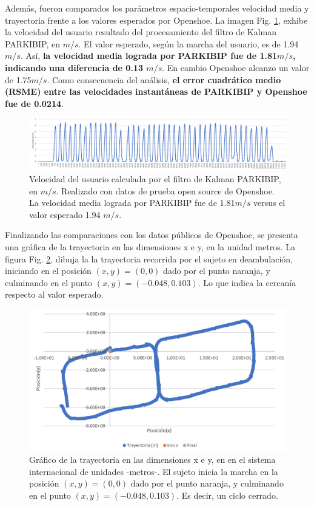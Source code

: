 Además, fueron comparados los parámetros espacio-temporales velocidad media y trayectoria frente a los valores esperados por Openshoe. La imagen Fig. \ref{fig:openshoe-velocity}, exhibe la velocidad del usuario resultado del procesamiento del filtro de Kalman PARKIBIP, en $m/s$. El valor esperado, según la marcha del usuario, es de 1.94 $m/s$. Así, \textbf{la velocidad media lograda por PARKIBIP fue de 1.81$m/s$, indicando una diferencia de 0.13 $m/s$}.  En cambio Openshoe alcanzo un valor de 1.75$m/s$. Como consecuencia del análisis, \textbf{el error cuadrático medio (RSME) entre las velocidades instantáneas de PARKIBIP y Openshoe fue de 0.0214}.

\begin{figure}[h!]
\hspace*{-2.9cm}%
\includegraphics[clip,width=1.4 \columnwidth]{TESIS/imagenes/chap06/velocity-openshoe.PNG}
\caption{Velocidad del usuario calculada por el filtro de Kalman PARKIBIP, en $m/s$. Realizado con datos de prueba open source de Openshoe. La velocidad media lograda por PARKIBIP fue de 1.81$m/s$ versus el valor esperado 1.94 $m/s$. }
\label{fig:openshoe-velocity}
\end{figure}

Finalizando las comparaciones con los datos públicos de Openshoe, se presenta una gráfica de la trayectoria en las dimensiones x e y, en la unidad metros. La figura Fig. \ref{fig:openshoe-trajectory}, dibuja la la trayectoria recorrida por el sujeto en deambulación, iniciando en el posición $(x,y) =(0,0)$ dado por el punto naranja, y culminando en el punto $(x,y) =(-0.048,0.103)$. Lo que indica la cercanía respecto al valor esperado. 

\begin{figure}[h!]
\hspace*{-2.9cm}%
\includegraphics[clip,width=1.4 \columnwidth]{TESIS/imagenes/chap06/openshoe-trajectory.PNG}
\caption{Gráfico de la trayectoria en las dimensiones x e y, en en el sistema internacional de unidades -metros-. El sujeto inicia la marcha en la posición $(x,y) =(0,0)$ dado por el punto naranja, y culminando en el punto $(x,y) =(-0.048,0.103)$. Es decir, un ciclo cerrado.}
\label{fig:openshoe-trajectory}
\end{figure}

